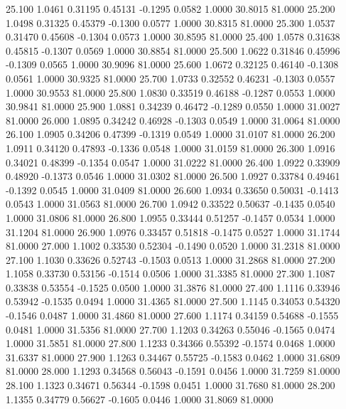   25.100   1.0461   0.31195   0.45131  -0.1295   0.0582   1.0000  30.8015  81.0000
  25.200   1.0498   0.31325   0.45379  -0.1300   0.0577   1.0000  30.8315  81.0000
  25.300   1.0537   0.31470   0.45608  -0.1304   0.0573   1.0000  30.8595  81.0000
  25.400   1.0578   0.31638   0.45815  -0.1307   0.0569   1.0000  30.8854  81.0000
  25.500   1.0622   0.31846   0.45996  -0.1309   0.0565   1.0000  30.9096  81.0000
  25.600   1.0672   0.32125   0.46140  -0.1308   0.0561   1.0000  30.9325  81.0000
  25.700   1.0733   0.32552   0.46231  -0.1303   0.0557   1.0000  30.9553  81.0000
  25.800   1.0830   0.33519   0.46188  -0.1287   0.0553   1.0000  30.9841  81.0000
  25.900   1.0881   0.34239   0.46472  -0.1289   0.0550   1.0000  31.0027  81.0000
  26.000   1.0895   0.34242   0.46928  -0.1303   0.0549   1.0000  31.0064  81.0000
  26.100   1.0905   0.34206   0.47399  -0.1319   0.0549   1.0000  31.0107  81.0000
  26.200   1.0911   0.34120   0.47893  -0.1336   0.0548   1.0000  31.0159  81.0000
  26.300   1.0916   0.34021   0.48399  -0.1354   0.0547   1.0000  31.0222  81.0000
  26.400   1.0922   0.33909   0.48920  -0.1373   0.0546   1.0000  31.0302  81.0000
  26.500   1.0927   0.33784   0.49461  -0.1392   0.0545   1.0000  31.0409  81.0000
  26.600   1.0934   0.33650   0.50031  -0.1413   0.0543   1.0000  31.0563  81.0000
  26.700   1.0942   0.33522   0.50637  -0.1435   0.0540   1.0000  31.0806  81.0000
  26.800   1.0955   0.33444   0.51257  -0.1457   0.0534   1.0000  31.1204  81.0000
  26.900   1.0976   0.33457   0.51818  -0.1475   0.0527   1.0000  31.1744  81.0000
  27.000   1.1002   0.33530   0.52304  -0.1490   0.0520   1.0000  31.2318  81.0000
  27.100   1.1030   0.33626   0.52743  -0.1503   0.0513   1.0000  31.2868  81.0000
  27.200   1.1058   0.33730   0.53156  -0.1514   0.0506   1.0000  31.3385  81.0000
  27.300   1.1087   0.33838   0.53554  -0.1525   0.0500   1.0000  31.3876  81.0000
  27.400   1.1116   0.33946   0.53942  -0.1535   0.0494   1.0000  31.4365  81.0000
  27.500   1.1145   0.34053   0.54320  -0.1546   0.0487   1.0000  31.4860  81.0000
  27.600   1.1174   0.34159   0.54688  -0.1555   0.0481   1.0000  31.5356  81.0000
  27.700   1.1203   0.34263   0.55046  -0.1565   0.0474   1.0000  31.5851  81.0000
  27.800   1.1233   0.34366   0.55392  -0.1574   0.0468   1.0000  31.6337  81.0000
  27.900   1.1263   0.34467   0.55725  -0.1583   0.0462   1.0000  31.6809  81.0000
  28.000   1.1293   0.34568   0.56043  -0.1591   0.0456   1.0000  31.7259  81.0000
  28.100   1.1323   0.34671   0.56344  -0.1598   0.0451   1.0000  31.7680  81.0000
  28.200   1.1355   0.34779   0.56627  -0.1605   0.0446   1.0000  31.8069  81.0000

